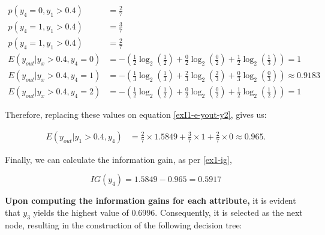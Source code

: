 \documentclass[12pt]{article}
\begin{document}
\begin{enumerate}[leftmargin=\labelsep]
    \[
        \begin{aligned}
            p(y_4 = 0, y_1 > 0.4)          & = \frac{2}{7}                                                                                       \\
            p(y_4 = 1, y_1 > 0.4)          & = \frac{3}{7}                                                                                       \\
            p(y_4 = 1, y_1 > 0.4)          & = \frac{2}{7}                                                                                       \\
            E(y_{out} | y_x > 0.4 , y_4 = 0) & = - \left(\frac{1}{2} \log_2\left(\frac{1}{2}\right) + \frac{0}{2} \log_2\left(\frac{0}{2}\right)
                + \frac{1}{2} \log_2\left(\frac{1}{3}\right)\right) = 1                                                                          \\
            E(y_{out} | y_x > 0.4 , y_4 = 1) & = - \left(\frac{1}{3} \log_2\left(\frac{1}{3}\right) + \frac{2}{3} \log_2\left(\frac{2}{3}\right)
                + \frac{0}{3} \log_2\left(\frac{0}{3}\right)\right) \approx 0.9183                                                               \\
            E(y_{out} | y_x > 0.4 , y_4 = 2) & = - \left(\frac{1}{2} \log_2\left(\frac{1}{2}\right) + \frac{0}{2} \log_2\left(\frac{0}{2}\right)
                + \frac{1}{2} \log_2\left(\frac{1}{2}\right)\right) = 1
        \end{aligned}
    \]

    Therefore, replacing these values on equation \eqref{exI1-e-yout-y2}, gives us:

    \[
        \begin{aligned}
            E(y_{out} | y_1>0.4, y_4) & = \frac{2}{7} \times 1.5849 + \frac{3}{7} \times 1 +  \frac{2}{7} \times 0 \approx 0.965.
        \end{aligned}
    \]

    Finally, we can calculate the information gain, as per \eqref{ex1-ig},

    \[
        IG(y_{4}) = 1.5849 - 0.965 = 0.5917
    \]

    \textbf{Upon computing the information gains for each attribute,} it is evident that $y_3$ yields the highest value of 0.6996. Consequently,
        it is selected as the next node, resulting in the construction of the following decision tree:


\end{enumerate}
\end{document}
